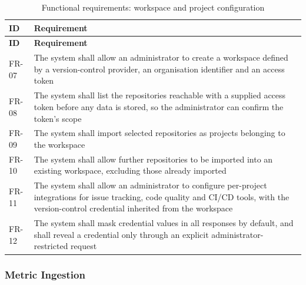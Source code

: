 \begin{longtable}{
  >{\raggedright\arraybackslash}p{}
  >{\raggedright\arraybackslash}p{}
}
\caption{Functional requirements: workspace and project configuration}
\label{tab:fr-workspace}\\
\toprule
\textbf{ID} & \textbf{Requirement} \\
\midrule
\endfirsthead
\toprule
\textbf{ID} & \textbf{Requirement} \\
\midrule
\endhead
\bottomrule
\endlastfoot
FR-07 & The system shall allow an administrator to create a workspace defined by a
version-control provider, an organisation identifier and an access token \\
\addlinespace
FR-08 & The system shall list the repositories reachable with a supplied access token
before any data is stored, so the administrator can confirm the token's scope \\
\addlinespace
FR-09 & The system shall import selected repositories as projects belonging to the
workspace \\
\addlinespace
FR-10 & The system shall allow further repositories to be imported into an existing
workspace, excluding those already imported \\
\addlinespace
FR-11 & The system shall allow an administrator to configure per-project integrations
for issue tracking, code quality and CI/CD tools, with the
version-control credential inherited from the workspace \\
\addlinespace
FR-12 & The system shall mask credential values in all responses by default, and
shall reveal a credential only through an explicit administrator-restricted request
\\
\end{longtable}

\subsubsection{Metric Ingestion}

